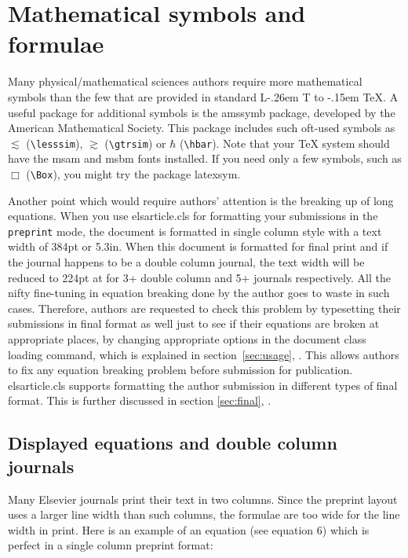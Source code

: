 \documentclass[a4paper,12pt]{article}
\makeatletter
\def\file#1{\textsf{#1}\xspace}
\DeclareRobustCommand{\LaTeX}{L\kern-.26em%
        {\sbox\z@ T%
         \vbox to\ht\z@{\hbox{\check@mathfonts
           \fontsize\sf@size\z@
           \math@fontsfalse\selectfont
          A\,}%
         \vss}%
        }%
     \kern-.15em%
    \TeX}
\makeatother
\begin{document}
\section[Mathematical ...]{Mathematical symbols and formulae}

Many physical/mathematical sciences authors require more
mathematical symbols than the few that are provided in standard
\LaTeX. A useful package for additional symbols is the
\file{amssymb} package, developed by the American Mathematical
Society. This package includes such oft-used symbols as
$\lesssim$ (\verb+\lesssim+), $\gtrsim$ (\verb+\gtrsim+)  or 
$\hbar$ (\verb+\hbar+). Note that your \TeX{}
system should have the \file{msam} and \file{msbm} fonts installed. If
you need only a few symbols, such as $\Box$ (\verb+\Box+), you might try the
package \file{latexsym}.

Another point which would require authors' attention is the
breaking up of long equations.  When you use
\file{elsarticle.cls} for formatting your submissions in the 
\verb+preprint+ mode, the document is formatted in single column
style with a text width of 384pt or 5.3in.  When this document is
formatted for final print and if the journal happens to be a double column
journal, the text width will be reduced to 224pt at for 3+
double column and 5+ journals respectively. All the nifty 
fine-tuning in equation breaking done by the author goes to waste in
such cases.  Therefore, authors are requested to check this
problem by typesetting their submissions in final format as well
just to see if their equations are broken at appropriate places,
by changing appropriate options in the document class loading
command, which is explained in section~\ref{sec:usage},
. This allows authors to fix any equation breaking
problem before submission for publication.
\file{elsarticle.cls} supports formatting the author submission
in different types of final format.  This is further discussed in
section \ref{sec:final}, .


\subsection*{Displayed equations and double column journals}

Many Elsevier journals print their text in two columns. Since
the preprint layout uses a larger line width than such columns,
the formulae are too wide for the line width in print. Here is an
example of an equation  (see equation 6) which is perfect in a
single column preprint format:
\end{document}
